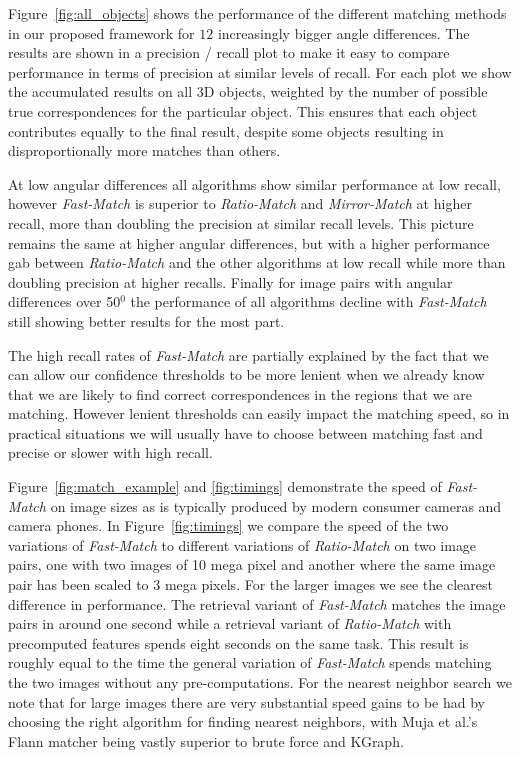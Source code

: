 \documentclass[runningheads]{llncs}
\begin{document}
Figure~\ref{fig:all_objects} shows the performance of the different matching methods in our proposed framework for $12$ increasingly bigger angle differences. The results are shown in a precision / recall plot to make it easy to compare performance in terms of precision at similar levels of recall.  For each plot we show the accumulated results on all 3D objects, weighted by the number of possible true correspondences for the particular object. This ensures that each object contributes equally to the final result, despite some objects resulting in disproportionally more matches than others.

At low angular differences all algorithms show similar performance at low recall, however \emph{Fast-Match} is superior to \emph{Ratio-Match} and \emph{Mirror-Match} at higher recall, more than doubling the precision at similar recall levels. This picture remains the same at higher angular differences, but with a higher performance gab between \emph{Ratio-Match} and the other algorithms at low recall while more than doubling precision at higher recalls. Finally for image pairs with angular differences over 50$^0$ the performance of all algorithms decline with \emph{Fast-Match} still showing better results for the most part. 

The high recall rates of \emph{Fast-Match} are partially explained by the fact that we can allow our confidence thresholds to be more lenient when we already know that we are likely to find correct correspondences in the regions that we are matching. However lenient thresholds can easily impact the matching speed, so in practical situations we will usually have to choose between matching fast and precise or slower with high recall. 

Figure~\ref{fig:match_example} and \ref{fig:timings} demonstrate the speed of \emph{Fast-Match} on image sizes as is typically produced by modern consumer cameras and camera phones. In Figure~\ref{fig:timings} we compare the speed of the two variations of \emph{Fast-Match} to different variations of \emph{Ratio-Match} on two image pairs, one with two images of 10 mega pixel and another where the same image pair has been scaled to 3 mega pixels. For the larger images we see the clearest difference in performance. The retrieval variant of \emph{Fast-Match} matches the image pairs in around one second while a retrieval variant of \emph{Ratio-Match} with precomputed features spends eight seconds on the same task. This result is roughly equal to the time the general variation of \emph{Fast-Match} spends matching the two images without any pre-computations. For the nearest neighbor search we note that for large images there are very substantial speed gains to be had by choosing the right algorithm for finding nearest neighbors, with Muja et al.'s Flann matcher being vastly superior to brute force and KGraph. 
\end{document}
